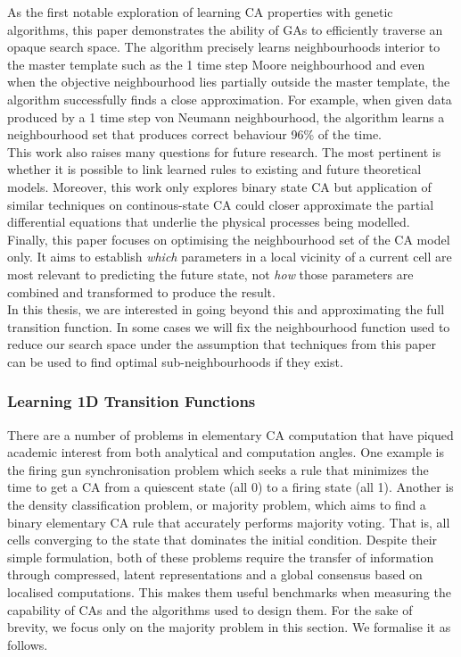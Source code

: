 As the first notable exploration of learning CA properties with genetic algorithms, this paper demonstrates the ability of GAs to efficiently traverse an opaque search space. The algorithm precisely learns neighbourhoods interior to the master template such as the 1 time step Moore neighbourhood and even when the objective neighbourhood lies partially outside the master template, the algorithm successfully finds a close approximation. For example, when given data produced by a 1 time step von Neumann neighbourhood, the algorithm learns a neighbourhood set that produces correct behaviour 96\% of the time.\\

This work also raises many questions for future research. The most pertinent is whether it is possible to link learned rules to existing and future theoretical models. Moreover, this work only explores binary state CA but application of similar techniques on continous-state CA could closer approximate the partial differential equations that underlie the physical processes being modelled.\\

Finally, this paper focuses on optimising the neighbourhood set of the CA model only. It aims to establish \textit{which} parameters in a local vicinity of a current cell are most relevant to predicting the future state, not \textit{how} those parameters are combined and transformed to produce the result.\\ In this thesis, we are interested in going beyond this and approximating the full transition function. In some cases we will fix the neighbourhood function used to reduce our search space under the assumption that techniques from this paper can be used to find optimal sub-neighbourhoods if they exist.\\


\subsubsection{Learning 1D Transition Functions}

There are a number of problems in elementary CA computation that have piqued academic interest from both analytical and computation angles. One example is the firing gun synchronisation problem\cite{moore1964firing} which seeks a rule that minimizes the time to get a CA from a quiescent state (all 0) to a firing state (all 1). Another is the density classification problem, or majority problem, which aims to find a binary elementary CA rule that accurately performs majority voting. That is, all cells converging to the state that dominates the initial condition. Despite their simple formulation, both of these problems require the transfer of information through compressed, latent representations and a global consensus based on localised computations. This makes them useful benchmarks when measuring the capability of CAs and the algorithms used to design them. For the sake of brevity, we focus only on the majority problem in this section. We formalise it as follows.

